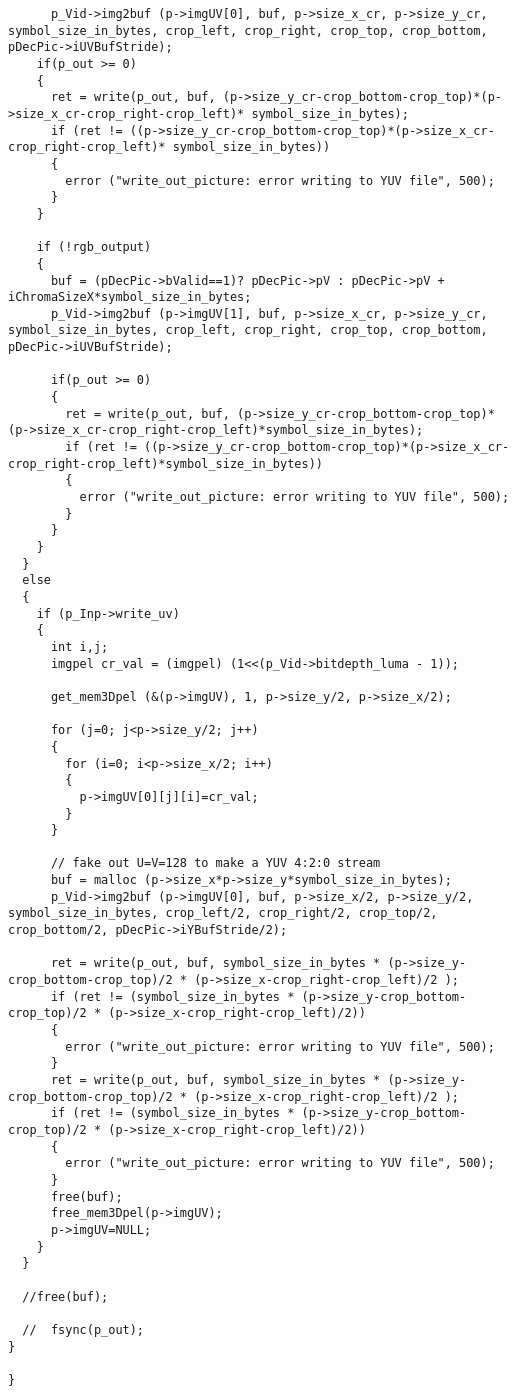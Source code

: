 \begin{lstlisting}
      p_Vid->img2buf (p->imgUV[0], buf, p->size_x_cr, p->size_y_cr, symbol_size_in_bytes, crop_left, crop_right, crop_top, crop_bottom, pDecPic->iUVBufStride);
    if(p_out >= 0)
    {
      ret = write(p_out, buf, (p->size_y_cr-crop_bottom-crop_top)*(p->size_x_cr-crop_right-crop_left)* symbol_size_in_bytes);
      if (ret != ((p->size_y_cr-crop_bottom-crop_top)*(p->size_x_cr-crop_right-crop_left)* symbol_size_in_bytes))
      {
        error ("write_out_picture: error writing to YUV file", 500);
      }
    }

    if (!rgb_output)
    {
      buf = (pDecPic->bValid==1)? pDecPic->pV : pDecPic->pV + iChromaSizeX*symbol_size_in_bytes;
      p_Vid->img2buf (p->imgUV[1], buf, p->size_x_cr, p->size_y_cr, symbol_size_in_bytes, crop_left, crop_right, crop_top, crop_bottom, pDecPic->iUVBufStride);

      if(p_out >= 0)
      {
        ret = write(p_out, buf, (p->size_y_cr-crop_bottom-crop_top)*(p->size_x_cr-crop_right-crop_left)*symbol_size_in_bytes);
        if (ret != ((p->size_y_cr-crop_bottom-crop_top)*(p->size_x_cr-crop_right-crop_left)*symbol_size_in_bytes))
        {
          error ("write_out_picture: error writing to YUV file", 500);
        }
      }
    }
  }
  else
  {
    if (p_Inp->write_uv)
    {
      int i,j;
      imgpel cr_val = (imgpel) (1<<(p_Vid->bitdepth_luma - 1));

      get_mem3Dpel (&(p->imgUV), 1, p->size_y/2, p->size_x/2);
      
      for (j=0; j<p->size_y/2; j++)
      {
        for (i=0; i<p->size_x/2; i++)
        {
          p->imgUV[0][j][i]=cr_val;
        }
      }

      // fake out U=V=128 to make a YUV 4:2:0 stream
      buf = malloc (p->size_x*p->size_y*symbol_size_in_bytes);
      p_Vid->img2buf (p->imgUV[0], buf, p->size_x/2, p->size_y/2, symbol_size_in_bytes, crop_left/2, crop_right/2, crop_top/2, crop_bottom/2, pDecPic->iYBufStride/2);

      ret = write(p_out, buf, symbol_size_in_bytes * (p->size_y-crop_bottom-crop_top)/2 * (p->size_x-crop_right-crop_left)/2 );
      if (ret != (symbol_size_in_bytes * (p->size_y-crop_bottom-crop_top)/2 * (p->size_x-crop_right-crop_left)/2))
      {
        error ("write_out_picture: error writing to YUV file", 500);
      }
      ret = write(p_out, buf, symbol_size_in_bytes * (p->size_y-crop_bottom-crop_top)/2 * (p->size_x-crop_right-crop_left)/2 );
      if (ret != (symbol_size_in_bytes * (p->size_y-crop_bottom-crop_top)/2 * (p->size_x-crop_right-crop_left)/2))
      {
        error ("write_out_picture: error writing to YUV file", 500);
      }
      free(buf);
      free_mem3Dpel(p->imgUV);
      p->imgUV=NULL;
    }
  }

  //free(buf);

  //  fsync(p_out);
}

}

\end{lstlisting}

